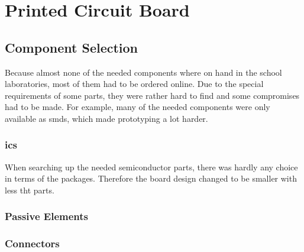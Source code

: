\chapter{Printed Circuit Board}


\section{Component Selection}

Because almost none of the needed components where on hand in the school laboratories, most of them had to be ordered online. Due to the special requirements of some parts, they were rather hard to find and some compromises had to be made. For example, many of the needed components were only available as \acrshort{smd}s, which made prototyping a lot harder.

\subsection{\acrshort{ic}s}

When searching up the needed semiconductor parts, there was hardly any choice in terms of the packages. Therefore the board design changed to be smaller with less \acrshort{tht} parts. 

\subsection{Passive Elements}



\subsection{Connectors}





